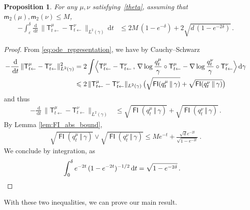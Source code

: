 \documentclass[12pt]{article}
\newcommand{\1}{\mathds{1}}
\newcommand*{\rd}{\mathrm{d}}
\newcommand*{\dd}{\, \rd}
\newcommand{\eps}{\varepsilon}
\newcommand{\mmid}{\,\Vert\,}
\DeclareMathOperator*{\FI}{\mathsf{FI}}
\renewcommand{\leq}{\leqslant}
\renewcommand{\le}{\leqslant}
\newcommand{\KM}{\mathsf T}
\newcommand{\mom}{\mathsf m_2}
\theoremstyle{plain}
\newtheorem{proposition}[theorem]{Proposition}
\theoremstyle{definition}
\theoremstyle{remark}
\begin{document}
\begin{proposition}\label{prop:ineq_2}
For any $\mu,\nu$ satisfying~\eqref{theta}, assuming that $\mom(\mu),\mom(\nu)\leq M$,
\begin{align*}
    - \int_\eps^\delta \frac{\dd}{\dd t}\, \|\KM^\mu_{t\gets} - \KM^\nu_{t\gets}\|_{L^2(\gamma)} \dd t
    &\le 2M\,(1-e^{-\delta}) + 2\sqrt{d\,(1-e^{-2\delta})}\,.
\end{align*}
\end{proposition}
\begin{proof}
From \eqref{eq:ode_representation}, we have by Cauchy--Schwarz
\begin{align*}
    -\frac{\dd}{\dd t}\, \|\KM^\mu_{t\gets} - \KM^\nu_{t\gets}\|_{L^2(\gamma)}^2
    &=2\int\Bigl\langle \KM^\mu_{t\gets} - \KM^\nu_{t\gets}\,,\, \nabla \log \frac{q_t^\mu}{\gamma}\circ \KM^\mu_{t\gets} - \nabla \log \frac{q_t^\nu}{\gamma}\circ \KM^\nu_{t\gets} \Bigr\rangle\dd \gamma \\
    &\leq 2\, \|\KM^\mu_{t\gets} - \KM^\nu_{t\gets}\|_{L^2(\gamma)}\,\bigl(\sqrt{\FI(q_t^\mu\mmid \gamma)} + \sqrt{\FI(q_t^\nu\mmid \gamma)}\bigr)
\end{align*}
and thus
\begin{align*}
    -\frac{\dd}{\dd t}\, \|\KM^\mu_{t\gets} - \KM^\nu_{t\gets}\|_{L^2(\gamma)}
    &\le \sqrt{\FI(q_t^\mu\mmid \gamma)} + \sqrt{\FI(q_t^\nu\mmid \gamma)}\,.
\end{align*}
By Lemma \ref{lem:FI_abs_bound}, 
\begin{align*}
    \sqrt{\FI(q_{t}^\mu\mmid\gamma)}\vee \sqrt{\FI(q_{t}^\nu\mmid\gamma)} \leq Me^{-t} + \frac{\sqrt d e^{-2t}}{\sqrt{1-e^{-2t}}}\,.
\end{align*}
We conclude by integration, as
\begin{align*}
\int_{0}^\delta  e^{-2t}\, (1-e^{-2t})^{-1/2}\dd t
&=  \sqrt{1-e^{-2\delta}}\,. \qedhere
\end{align*}
\qedhere
\end{proof}

With these two inequalities, we can prove our main result.
\end{document}
